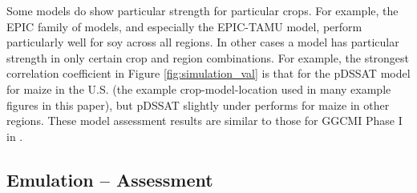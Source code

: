 \documentclass[gmd, manuscript]{copernicus} %
\begin{document}
Some models do show particular strength for particular crops. For example, the EPIC family of models, and especially the EPIC-TAMU model, perform particularly well for soy across all regions. In other cases a model has particular strength in only certain crop and region combinations. For example, the strongest correlation coefficient in Figure \ref{fig:simulation_val} is that for the pDSSAT model for maize in the U.S. (the example crop-model-location used in many example figures in this paper), but pDSSAT slightly under performs for maize in other regions. These model assessment results are similar to those for GGCMI Phase I in \citet{muller_global_2017}.

\subsection{Emulation -- Assessment}
\label{A:2}
\end{document}

